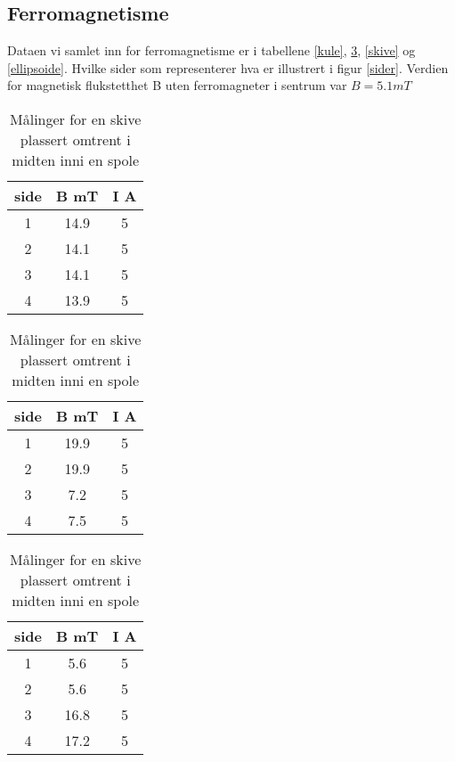 \documentclass[norsk,a4paper,12pt]{article}
\begin{document}
\subsection{Ferromagnetisme}
Dataen vi samlet inn for ferromagnetisme er i tabellene \ref{kule}, \ref{stang}, \ref{skive} og \vref{ellipsoide}. Hvilke sider som representerer hva er illustrert i figur \vref{sider}. Verdien for magnetisk flukstetthet B uten ferromagneter i sentrum var $B = 5.1mT$\\
\begin{table}[!h]
	\begin{minipage}{.5\linewidth}
	\caption[Kule]{Målinger for en kule plassert omtrent i midten inni en spole}
	\centering
		\begin{tabular}{|c|c|c|}
		\hline
		side & B mT & I A\\
		\hline
		1 & 14.9 & 5\\
		2 & 14.1 & 5\\
		3 & 14.1 & 5\\
		4 & 13.9 & 5\\
		\hline
		\end{tabular}
		\label{kule}
	\end{minipage}
	\hspace{.5cm}
	\begin{minipage}{.5\linewidth}
	\caption[Stang]{Målinger for en stang plassert omtrent i midten inni en spole}
	\centering
		\begin{tabular}{|c|c|c|}
		\hline
		side & B mT & I A\\
		\hline
		1 & 19.9 & 5\\
		2 & 19.9 & 5\\
		3 & 7.2 & 5\\
		4 & 7.5 & 5\\
		\hline
		\end{tabular}
		\label{stang}
	\end{minipage}
	\hspace{.5cm}
	\begin{minipage}{.5\linewidth}
	\caption[Skive]{Målinger for en skive plassert omtrent i midten inni en spole}
	\centering
		\begin{tabular}{|c|c|c|}
		\hline
		side & B mT & I A\\
		\hline
		1 & 5.6 & 5\\
		2 & 5.6 & 5\\
		3 & 16.8 & 5\\
		4 & 17.2 & 5\\
		\hline
		\end{tabular}

\end{minipage}
\end{table}
\end{document}
